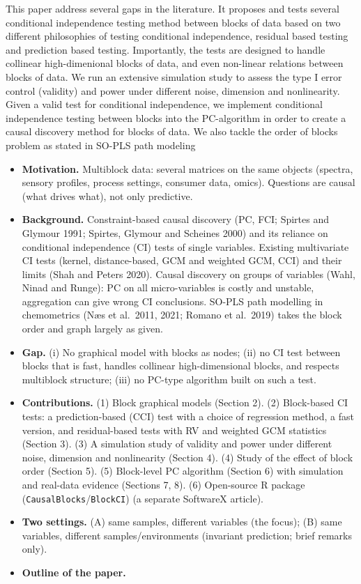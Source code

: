 \documentclass[10pt,leqno]{amsart}
\begin{document}
This paper address several gaps in the literature. It proposes and tests several conditional independence testing method between blocks of data based on two different philosophies of testing conditional independence, residual based testing and prediction based testing. Importantly, the tests are designed to handle collinear high-dimenional blocks of data, and even non-linear relations between blocks of data. We run an extensive simulation study to assess the type I error control (validity) and power under different noise, dimension and nonlinearity. Given a valid test for conditional independence, we implement conditional independence testing between blocks into the PC-algorithm in order to create a causal discovery method for blocks of data. We also tackle the order of blocks problem as stated in SO-PLS path modeling \cite{Naes2011, Romano2019}  

 
\begin{itemize}
\item \textbf{Motivation.} Multiblock data: several matrices on the same objects
  (spectra, sensory profiles, process settings, consumer data, omics). Questions
  are causal (what drives what), not only predictive.
\item \textbf{Background.} Constraint-based causal discovery (PC, FCI; Spirtes and
  Glymour 1991; Spirtes, Glymour and Scheines 2000) and its reliance on
  conditional independence (CI) tests of single variables. Existing multivariate CI
  tests (kernel, distance-based, GCM and weighted GCM, CCI) and their limits
  (Shah and Peters 2020). Causal discovery on groups of variables (Wahl, Ninad and
  Runge): PC on all micro-variables is costly and unstable, aggregation can give
  wrong CI conclusions. SO-PLS path modelling in chemometrics (N\ae s et al.\ 2011,
  2021; Romano et al.\ 2019) takes the block order and graph largely as given.
\item \textbf{Gap.} (i) No graphical model with blocks as nodes; (ii) no CI test
  between blocks that is fast, handles collinear high-dimensional blocks, and
  respects multiblock structure; (iii) no PC-type algorithm built on such a test.
\item \textbf{Contributions.} (1) Block graphical models (Section 2).
  (2) Block-based CI tests: a prediction-based (CCI) test with a choice of
  regression method, a fast version, and residual-based tests with RV and weighted
  GCM statistics (Section 3).
  (3) A simulation study of validity and power under different noise, dimension
  and nonlinearity (Section 4).
  (4) Study of the effect of block order (Section 5).
  (5) Block-level PC algorithm (Section 6) with simulation and real-data evidence
  (Sections 7, 8).
  (6) Open-source R package (\texttt{CausalBlocks}/\texttt{BlockCI}) (a separate
  SoftwareX article).
\item \textbf{Two settings.} (A) same samples, different variables (the focus);
  (B) same variables, different samples/environments (invariant prediction;
  brief remarks only).
\item \textbf{Outline of the paper.}
\end{itemize}
\end{document}
